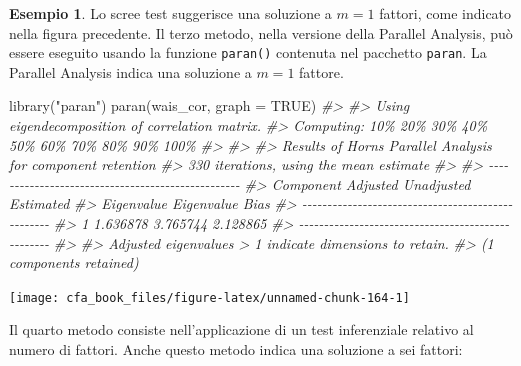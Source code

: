 \documentclass[
  11pt,
]{krantz}
\makeatletter
\newenvironment{Shaded}{\begin{snugshade}}{\end{snugshade}}
\newcommand{\AttributeTok}[1]{\textcolor[rgb]{0.61,0.61,0.61}{#1}}
\newcommand{\CommentTok}[1]{\textcolor[rgb]{0.37,0.37,0.37}{\textit{#1}}}
\newcommand{\ConstantTok}[1]{\textcolor[rgb]{0,0,0}{#1}}
\newcommand{\FunctionTok}[1]{\textcolor[rgb]{0,0,0}{#1}}
\newcommand{\NormalTok}[1]{#1}
\newcommand{\StringTok}[1]{\textcolor[rgb]{0.5,0.5,0.5}{#1}}
\newenvironment{kframe}{%
\medskip{}
\setlength{\fboxsep}{.8em}
 \def\at@end@of@kframe{}%
 \ifinner\ifhmode%
  \def\at@end@of@kframe{\end{minipage}}%
  \begin{minipage}{\columnwidth}%
 \fi\fi%
 \def\FrameCommand##1{\hskip\@totalleftmargin \hskip-\fboxsep
 \colorbox{shadecolor}{##1}\hskip-\fboxsep
     \hskip-\linewidth \hskip-\@totalleftmargin \hskip\columnwidth}%
 \MakeFramed {\advance\hsize-\width
   \@totalleftmargin\z@ \linewidth\hsize
   \@setminipage}}%
 {\par\unskip\endMakeFramed%
 \at@end@of@kframe}
\renewenvironment{Shaded}{\begin{kframe}}{\end{kframe}}
\theoremstyle{definition}
\theoremstyle{definition}
\newtheorem{example}{Esempio}[chapter]
\theoremstyle{definition}
\theoremstyle{definition}
\theoremstyle{remark}
\makeatother
\begin{document}
\begin{example}
Lo scree test suggerisce una soluzione a \(m=1\) fattori, come indicato nella figura precedente. Il terzo metodo, nella versione della Parallel Analysis, può essere eseguito usando la funzione \texttt{paran()} contenuta nel pacchetto \texttt{paran}. La Parallel Analysis indica una soluzione a \(m=1\) fattore.

\begin{Shaded}
\begin{Highlighting}[]
\FunctionTok{library}\NormalTok{(}\StringTok{"paran"}\NormalTok{)}
\FunctionTok{paran}\NormalTok{(wais\_cor, }\AttributeTok{graph =} \ConstantTok{TRUE}\NormalTok{)}
\CommentTok{\#\textgreater{} }
\CommentTok{\#\textgreater{} Using eigendecomposition of correlation matrix.}
\CommentTok{\#\textgreater{} Computing: 10\%  20\%  30\%  40\%  50\%  60\%  70\%  80\%  90\%  100\%}
\CommentTok{\#\textgreater{} }
\CommentTok{\#\textgreater{} }
\CommentTok{\#\textgreater{} Results of Horn\textquotesingle{}s Parallel Analysis for component retention}
\CommentTok{\#\textgreater{} 330 iterations, using the mean estimate}
\CommentTok{\#\textgreater{} }
\CommentTok{\#\textgreater{} {-}{-}{-}{-}{-}{-}{-}{-}{-}{-}{-}{-}{-}{-}{-}{-}{-}{-}{-}{-}{-}{-}{-}{-}{-}{-}{-}{-}{-}{-}{-}{-}{-}{-}{-}{-}{-}{-}{-}{-}{-}{-}{-}{-}{-}{-}{-}{-}{-}{-} }
\CommentTok{\#\textgreater{} Component   Adjusted    Unadjusted    Estimated }
\CommentTok{\#\textgreater{}             Eigenvalue  Eigenvalue    Bias }
\CommentTok{\#\textgreater{} {-}{-}{-}{-}{-}{-}{-}{-}{-}{-}{-}{-}{-}{-}{-}{-}{-}{-}{-}{-}{-}{-}{-}{-}{-}{-}{-}{-}{-}{-}{-}{-}{-}{-}{-}{-}{-}{-}{-}{-}{-}{-}{-}{-}{-}{-}{-}{-}{-}{-} }
\CommentTok{\#\textgreater{} 1           1.636878    3.765744      2.128865}
\CommentTok{\#\textgreater{} {-}{-}{-}{-}{-}{-}{-}{-}{-}{-}{-}{-}{-}{-}{-}{-}{-}{-}{-}{-}{-}{-}{-}{-}{-}{-}{-}{-}{-}{-}{-}{-}{-}{-}{-}{-}{-}{-}{-}{-}{-}{-}{-}{-}{-}{-}{-}{-}{-}{-} }
\CommentTok{\#\textgreater{} }
\CommentTok{\#\textgreater{} Adjusted eigenvalues \textgreater{} 1 indicate dimensions to retain.}
\CommentTok{\#\textgreater{} (1 components retained)}
\end{Highlighting}
\end{Shaded}

\begin{center}\texttt{[image: cfa\_book\_files/figure-latex/unnamed-chunk-164-1]} \end{center}

Il quarto metodo consiste nell'applicazione di un test inferenziale relativo al numero di fattori. Anche questo metodo indica una soluzione a sei fattori:


\end{example}
\end{document}
